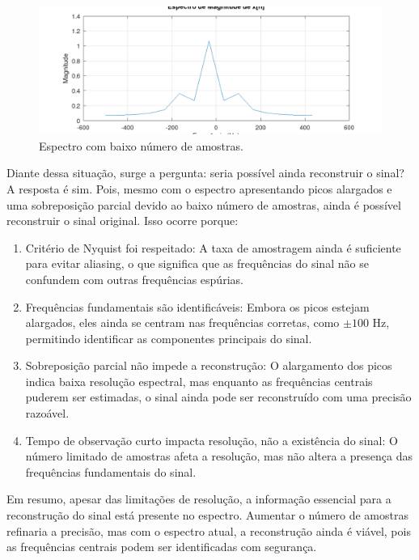 \begin{figure}[H]
    \centering
    \includegraphics[width=1\linewidth]{03_results/assets/aliasing.png}
    \caption{Espectro com baixo número de amostras.}
    \label{fig:sim-low-sampling}
\end{figure}

Diante dessa situação, surge a pergunta: seria possível ainda reconstruir o sinal? A resposta é sim. Pois, mesmo com o espectro apresentando picos alargados e uma sobreposição parcial devido ao baixo número de amostras, ainda é possível reconstruir o sinal original. Isso ocorre porque:

\begin{enumerate}
    \item Critério de Nyquist foi respeitado: A taxa de amostragem ainda é suficiente para evitar aliasing, o que significa que as frequências do sinal não se confundem com outras frequências espúrias.
    \item Frequências fundamentais são identificáveis: Embora os picos estejam alargados, eles ainda se centram nas frequências corretas, como \( \pm 100 \) Hz, permitindo identificar as componentes principais do sinal.
    \item Sobreposição parcial não impede a reconstrução: O alargamento dos picos indica baixa resolução espectral, mas enquanto as frequências centrais puderem ser estimadas, o sinal ainda pode ser reconstruído com uma precisão razoável.
    \item Tempo de observação curto impacta resolução, não a existência do sinal: O número limitado de amostras afeta a resolução, mas não altera a presença das frequências fundamentais do sinal.
\end{enumerate}

Em resumo, apesar das limitações de resolução, a informação essencial para a reconstrução do sinal está presente no espectro. Aumentar o número de amostras refinaria a precisão, mas com o espectro atual, a reconstrução ainda é viável, pois as frequências centrais podem ser identificadas com segurança.

